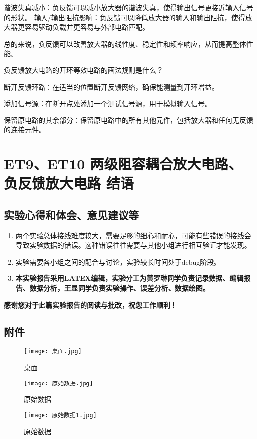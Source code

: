 \documentclass[dvipsnames, svgnames,a4paper,11pt]{article}
\begin{document}
谐波失真减小：负反馈可以减小放大器的谐波失真，使得输出信号更接近输入信号的形状。
输入/输出阻抗影响：负反馈可以降低放大器的输入和输出阻抗，使得放大器更容易驱动负载并更容易与外部电路匹配。

总的来说，负反馈可以改善放大器的线性度、稳定性和频率响应，从而提高整体性能。
\begin{question}
	负反馈放大电路的开环等效电路的画法规则是什么？
\end{question}

断开反馈环路：在适当的位置断开反馈网络，确保能测量到开环增益。

添加信号源：在断开点处添加一个测试信号源，用于模拟输入信号。

保留原电路的其余部分：保留原电路中的所有其他元件，包括放大器和任何无反馈的连接元件。

\clearpage
	\section{ ET9、ET10 两级阻容耦合放大电路、负反馈放大电路 \quad\heiti 结语}
	
	\subsection{实验心得和体会、意见建议等}
	\begin{enumerate}
		\item 两个实验总体接线难度较大，需要足够的细心和耐心，可能有些错误的接线会导致实验数据的错误。这种错误往往需要与其他小组进行相互验证才能发现。
		\item 实验需要各小组之间的配合与讨论，实验较长时间处于debug阶段。
		\item \textbf{本实验报告采用LATEX编辑，实验分工为黄罗琳同学负责记录数据、编辑报告、数据分析，王显同学负责实验操作、误差分析、数据绘图。}
	\end{enumerate}
	\quad \large \textbf{感谢您对于此篇实验报告的阅读与批改，祝您工作顺利！}
	

	\subsection{附件}
	\begin{figure}[H]
		\centering
		\begin{minipage}{0.3\textwidth}
			\centering
			\texttt{[image: 桌面.jpg]}
			\caption{桌面}
		\end{minipage}\hfill
		\begin{minipage}{0.3\textwidth}
			\centering
			\texttt{[image: 原始数据.jpg]}
			\caption{原始数据}
		\end{minipage}\hfill
		\begin{minipage}{0.3\textwidth}
			\centering
			\texttt{[image: 原始数据1.jpg]}
			\caption{原始数据}
		\end{minipage}
	\end{figure}
	
	
\end{document}
